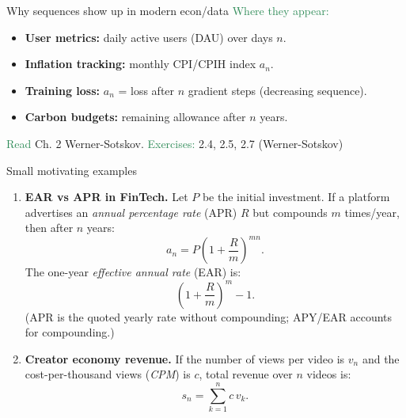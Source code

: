 \documentclass[11pt,aspectratio=169]{beamer}
\begin{document}
\begin{frame}{Why sequences show up in modern econ/data}
%
\textcolor{SeaGreen}{Where they appear:}
\begin{itemize}
\item \textbf{User metrics:} daily active users (DAU) over days $n$.\\[3mm]
\item \textbf{Inflation tracking:} monthly CPI/CPIH index $a_n$.\\[3mm]
\item \textbf{Training loss:} $a_n$ = loss after $n$ gradient steps (decreasing sequence).\\[3mm]
\item \textbf{Carbon budgets:} remaining allowance after $n$ years.\\[6mm]
\end{itemize}
\textcolor{SeaGreen}{Read} Ch. 2 Werner-Sotskov.\quad
\textcolor{SeaGreen}{Exercises:} 2.4, 2.5, 2.7 (Werner-Sotskov)
%
\end{frame}



\begin{frame}{Small motivating examples}
\begin{enumerate}
\item \textbf{EAR vs APR in FinTech.}  
Let \( P \) be the initial investment. If a platform advertises an \textit{annual percentage rate} (APR) \( R \) but compounds \( m \) times/year, then after \( n \) years:
\[
a_n = P\left(1+\frac{R}{m}\right)^{mn}.
\]
The one-year \textit{effective annual rate} (EAR) is:
\[
\left(1+\frac{R}{m}\right)^m - 1.
\]
{\small (APR is the quoted yearly rate without compounding; APY/EAR accounts for compounding.)}\\[3mm]


\item \textbf{Creator economy revenue.}  
If the number of views per video is \( v_n \) and the cost-per-thousand views (\textit{CPM}) is \( c \),  
total revenue over \( n \) videos is:
\[
s_n = \sum_{k=1}^n c\,v_k.
\]
\end{enumerate}
\end{frame}
\end{document}
